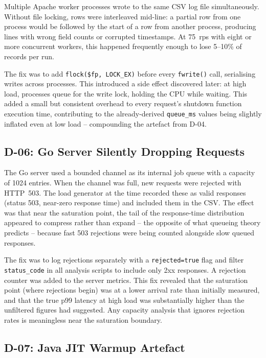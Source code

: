 Multiple Apache worker processes wrote to the same CSV log file simultaneously. Without file locking, rows were interleaved mid-line: a partial row from one process would be followed by the start of a row from another process, producing lines with wrong field counts or corrupted timestamps. At 75~rps with eight or more concurrent workers, this happened frequently enough to lose 5--10\% of records per run.

The fix was to add \texttt{flock(\$fp, LOCK\_EX)} before every \texttt{fwrite()} call, serialising writes across processes. This introduced a side effect discovered later: at high load, processes queue for the write lock, holding the CPU while waiting. This added a small but consistent overhead to every request's shutdown function execution time, contributing to the already-derived \texttt{queue\_ms} values being slightly inflated even at low load -- compounding the artefact from D-04.

\subsection{D-06: Go Server Silently Dropping Requests}

The Go server used a bounded channel as its internal job queue with a capacity of 1024 entries. When the channel was full, new requests were rejected with HTTP~503. The load generator at the time recorded these as valid responses (status 503, near-zero response time) and included them in the CSV. The effect was that near the saturation point, the tail of the response-time distribution appeared to compress rather than expand -- the opposite of what queueing theory predicts -- because fast 503 rejections were being counted alongside slow queued responses.

The fix was to log rejections separately with a \texttt{rejected=true} flag and filter \texttt{status\_code} in all analysis scripts to include only 2xx responses. A rejection counter was added to the server metrics. This fix revealed that the saturation point (where rejections begin) was at a lower arrival rate than initially measured, and that the true p99 latency at high load was substantially higher than the unfiltered figures had suggested. Any capacity analysis that ignores rejection rates is meaningless near the saturation boundary.

\subsection{D-07: Java JIT Warmup Artefact}

